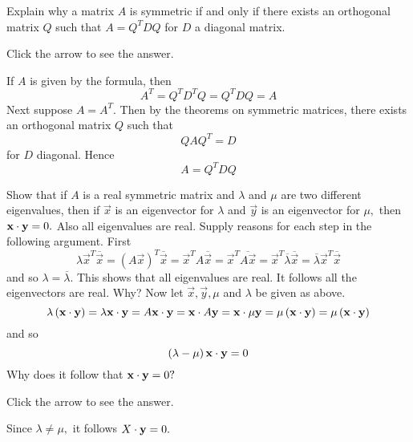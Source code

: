 \documentclass{ximera}
\begin{document}
 \begin{problem}\label{prb:9.13} Explain why a matrix $A$ is symmetric if and only if there exists an
orthogonal matrix $Q$ such that $A=Q^{T}DQ$ for $D$ a diagonal matrix.
\begin{hint} Click the arrow to see the answer. \begin{expandable}
If $A$ is given by the formula, then
\[
A^{T}=Q^{T}D^{T}Q=Q^{T}DQ=A
\]
Next suppose $A=A^{T}.$ Then by the theorems on symmetric matrices, there
exists an orthogonal matrix $Q$ such that
\[
QAQ^{T}=D
\]
for $D$ diagonal. Hence
\[
A=Q^{T}DQ
\]
\end{expandable} \end{hint}
\end{problem}

 \begin{problem}\label{prb:9.14} Show that if $A$ is a real symmetric matrix and
$\lambda $ and $\mu $ are two different eigenvalues, then if $\vec{x}$ is
an eigenvector for $\lambda $ and $\vec{y}$ is an eigenvector for $\mu ,$
then $\mathbf{x}\cdot \mathbf{y}=0.$ Also all eigenvalues are real. Supply reasons
for each step in the following argument. First
\begin{equation*}
\lambda \vec{x}^{T}\overline{\vec{x}}=\left( A\vec{x}\right) ^{T}
\overline{\vec{x}}=\vec{x}^{T}A\overline{\vec{x}}=\vec{x}^{T}
\overline{A\vec{x}}=\vec{x}^{T}\overline{\lambda }\overline{\vec{x}}
=\overline{\lambda }\vec{x}^{T}\overline{\vec{x}}
\end{equation*}
and so $\lambda =\overline{\lambda }.$ This shows that all eigenvalues are
real. It follows all the eigenvectors are real. Why? Now let $\vec{x},\vec{y}
,\mu $ and $\lambda $ be given as above. \
\begin{equation*}
\lambda \left( \mathbf{x}\cdot \mathbf{y}\right) =\lambda \mathbf{x}\cdot \mathbf{y}=A\mathbf{x}\cdot \mathbf{y}=\mathbf{x}\cdot A\mathbf{y}=\mathbf{x}\cdot \mu \mathbf{y}=\mu \left(
\mathbf{x}\cdot \mathbf{y}\right) =\mu \left( \mathbf{x}\cdot \mathbf{y}\right)
\end{equation*}
and so
\begin{equation*}
\left( \lambda -\mu \right) \mathbf{x}\cdot \mathbf{y}=0
\end{equation*}
Why does it follow that $\mathbf{x}\cdot \mathbf{y}=0?$

Click the arrow to see the answer. \begin{expandable}
Since $\lambda \neq \mu ,$ it follows $X \cdot \mathbf{y} =0.$
\end{expandable} 
\end{problem}
\end{document}
